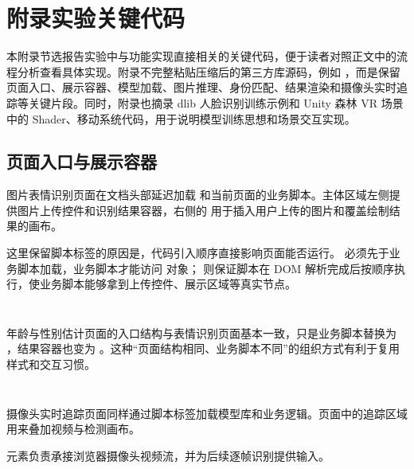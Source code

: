 \clearpage
{}
\section*{附录\quad 实验关键代码}

本附录节选报告实验中与功能实现直接相关的关键代码，便于读者对照正文中的流程分析查看具体实现。附录不完整粘贴压缩后的第三方库源码，例如 ，而是保留页面入口、展示容器、模型加载、图片推理、身份匹配、结果渲染和摄像头实时追踪等关键片段。同时，附录也摘录 dlib 人脸识别训练示例和 Unity 森林 VR 场景中的 Shader、移动系统代码，用于说明模型训练思想和场景交互实现。

\subsection*{页面入口与展示容器}

图片表情识别页面在文档头部延迟加载  和当前页面的业务脚本。主体区域左侧提供图片上传控件和识别结果容器，右侧的  用于插入用户上传的图片和覆盖绘制结果的画布。

这里保留脚本标签的原因是，代码引入顺序直接影响页面能否运行。 必须先于业务脚本加载，业务脚本才能访问  对象； 则保证脚本在 DOM 解析完成后按顺序执行，使业务脚本能够拿到上传控件、展示区域等真实节点。

\inputminted[firstline=21,lastline=22,firstnumber=21]{html}{code/face-recognition/face_expression_recognition.html}

\inputminted[firstline=75,lastline=101,firstnumber=75]{html}{code/face-recognition/face_expression_recognition.html}

年龄与性别估计页面的入口结构与表情识别页面基本一致，只是业务脚本替换为 ，结果容器也变为 。这种“页面结构相同、业务脚本不同”的组织方式有利于复用样式和交互习惯。

\inputminted[firstline=21,lastline=22,firstnumber=21]{html}{code/face-recognition/age_gender_estimation.html}

\inputminted[firstline=75,lastline=100,firstnumber=75]{html}{code/face-recognition/age_gender_estimation.html}

摄像头实时追踪页面同样通过脚本标签加载模型库和业务逻辑。页面中的追踪区域  用来叠加视频与检测画布。

 元素负责承接浏览器摄像头视频流，并为后续逐帧识别提供输入。

